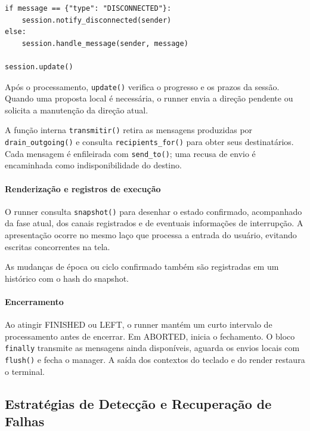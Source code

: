 \documentclass[11pt,a4paper]{article}
\begin{document}
\par\smallskip
\noindent
\begin{minipage}{\linewidth}
\begin{verbatim}
if message == {"type": "DISCONNECTED"}:
    session.notify_disconnected(sender)
else:
    session.handle_message(sender, message)

session.update()
\end{verbatim}
\end{minipage}
\par\smallskip

Após o processamento, \texttt{update()} verifica o progresso e os prazos da sessão. Quando uma proposta local é necessária, o runner envia a direção pendente ou solicita a manutenção da direção atual.

A função interna \texttt{transmitir()} retira as mensagens produzidas por \texttt{drain\_outgoing()} e consulta \texttt{recipients\_for()} para obter seus destinatários. Cada mensagem é enfileirada com \texttt{send\_to()}; uma recusa de envio é encaminhada como indisponibilidade do destino.

\paragraph{Renderização e registros de execução}

O runner consulta \texttt{snapshot()} para desenhar o estado confirmado, acompanhado da fase atual, dos canais registrados e de eventuais informações de interrupção. A apresentação ocorre no mesmo laço que processa a entrada do usuário, evitando escritas concorrentes na tela.

As mudanças de época ou ciclo confirmado também são registradas em um histórico com o hash do snapshot.

\paragraph{Encerramento}

Ao atingir FINISHED ou LEFT, o runner mantém um curto intervalo de processamento antes de encerrar. Em ABORTED, inicia o fechamento. O bloco \texttt{finally} transmite as mensagens ainda disponíveis, aguarda os envios locais com \texttt{flush()} e fecha o manager. A saída dos contextos do teclado e do render restaura o terminal.




\subsection{Estratégias de Detecção e Recuperação de Falhas}
\end{document}
